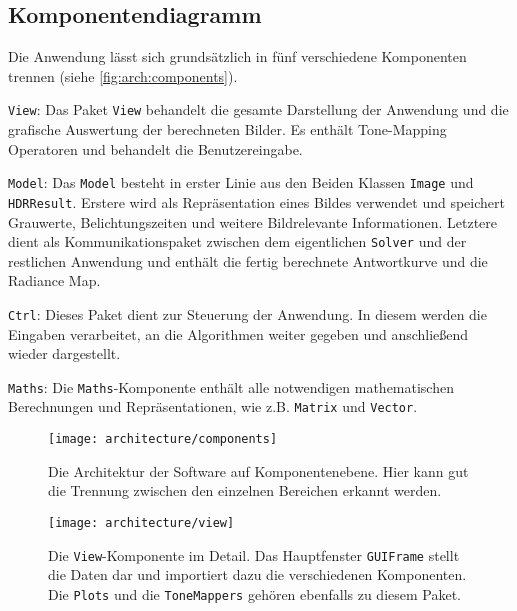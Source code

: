 \subsection{Komponentendiagramm}
Die Anwendung lässt sich grundsätzlich in fünf verschiedene Komponenten trennen (siehe \autoref{fig:arch:components}). 
\begin{description}
\item{\texttt{View}:} Das Paket \texttt{View} behandelt die gesamte Darstellung der Anwendung und die grafische Auswertung der berechneten Bilder. Es enthält \gls{Tone-Mapping} Operatoren und behandelt die Benutzereingabe.
\item{\texttt{Model}:} Das \texttt{Model} besteht in erster Linie aus den Beiden Klassen \texttt{Image} und \texttt{HDRResult}. Erstere wird als Repräsentation eines Bildes verwendet und speichert Grauwerte, Belichtungszeiten und weitere Bildrelevante Informationen. Letztere dient als Kommunikationspaket zwischen dem eigentlichen \texttt{Solver} und der restlichen Anwendung und enthält die fertig berechnete Antwortkurve und die \gls{Radiance Map}.
\item{\texttt{Ctrl}:} Dieses Paket dient zur Steuerung der Anwendung. In diesem werden die Eingaben verarbeitet, an die Algorithmen weiter gegeben und anschließend wieder dargestellt.
\item{\texttt{Maths}:} Die \texttt{Maths}-Komponente enthält alle notwendigen mathematischen Berechnungen und Repräsentationen, wie z.B. \texttt{Matrix} und \texttt{Vector}.
\end{description}

\begin{figure}[H]
  \begin{center}
    \texttt{[image: architecture/components]}
    \caption{Die Architektur der Software auf Komponentenebene. Hier kann gut die Trennung zwischen den einzelnen Bereichen erkannt werden.}
    \label{fig:arch:components}
  \end{center}
\end{figure}


\begin{figure}[H]
  \begin{center}
    \texttt{[image: architecture/view]}
    \caption{Die \texttt{View}-Komponente im Detail. Das Hauptfenster \texttt{GUIFrame} stellt die Daten dar und importiert dazu die verschiedenen Komponenten. Die \texttt{Plots} und die \texttt{ToneMappers} gehören ebenfalls zu diesem Paket.}
    \label{fig:arch:plots}
  \end{center}
\end{figure}


